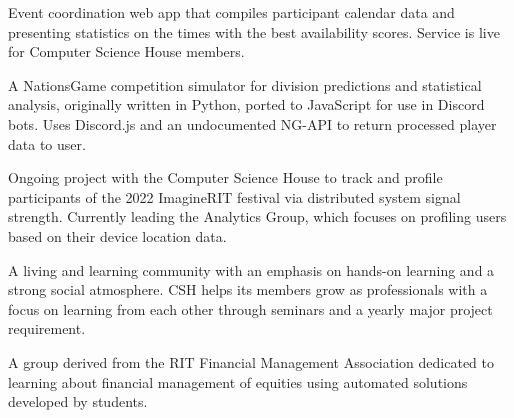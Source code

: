 \documentclass[10pt,a4paper,ragged2e,withhyper]{altacv}
\begin{document}
\begin{paracol}{2}


Event coordination web app that compiles participant calendar data and presenting statistics on the times with the best availability scores.  Service is live for Computer Science House members.\par\vspace{.15cm}


\divider


A NationsGame competition simulator for division predictions and statistical analysis, originally written in Python, ported to JavaScript for use in Discord bots.  Uses Discord.js and an undocumented NG-API to return processed player data to user.\par\vspace{.15cm}


\divider


Ongoing project with the Computer Science House to track and profile participants of the 2022 ImagineRIT festival via distributed system signal strength.  Currently leading the Analytics Group, which focuses on profiling users based on their device location data. \par\vspace{.15cm}

\medskip


A living and learning community with an emphasis on hands-on learning and a strong social atmosphere. CSH helps its members grow as professionals with a focus on learning from each other through seminars and a yearly major project requirement.

\divider

A group derived from the RIT Financial Management Association dedicated to learning about financial management of equities using automated solutions developed by students.


\end{paracol}
\end{document}
